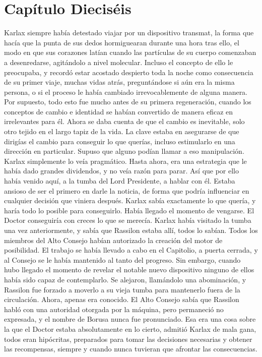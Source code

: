 \chapter*{Capítulo Dieciséis}

Karlax siempre había detestado viajar por un dispositivo transmat, la forma que hacía que la punta de sus dedos hormiguearan durante una hora tras ello, el modo en que sus corazones latían cuando las partículas de su cuerpo comenzaban a desenredarse, agitándolo a nivel molecular. Incluso el concepto de ello le preocupaba, y recordó estar acostado despierto toda la noche como consecuencia de su primer viaje, muchas vidas atrás, preguntándose si aún era la misma persona, o si el proceso le había cambiado irrevocablemente de alguna manera.
Por supuesto, todo esto fue mucho antes de su primera regeneración, cuando los conceptos de cambio e identidad se habían convertido de manera eficaz en irrelevantes para él. Ahora se daba cuenta de que el cambio es inevitable, solo otro tejido en el largo tapiz de la vida. La clave estaba en asegurarse de que dirigías el cambio para conseguir lo que querías, incluso estimularlo en una dirección en particular. Supuso que alguno podían llamar a eso manipulación. Karlax simplemente lo veía pragmático. Hasta ahora, era una estrategia que le había dado grandes dividendos, y no veía razón para parar.
Así que por ello había venido aquí, a la tumba del Lord Presidente, a hablar con él. Estaba ansioso de ser el primero en darle la noticia, de forma que podría influenciar en cualquier decisión que viniera después. Karlax sabía exactamente lo que quería, y haría todo lo posible para conseguirlo. Había llegado el momento de vengarse. El Doctor conseguiría con creces lo que se merecía.
Karlax había visitado la tumba una vez anteriormente, y sabía que Rassilon estaba allí, todos lo sabían. Todos los miembros del Alto Consejo habían autorizado la creación del motor de posibilidad. El trabajo se había llevado a cabo en el Capitolio, a puerta cerrada, y al Consejo se le había mantenido al tanto del progreso. Sin embargo, cuando hubo llegado el momento de revelar el notable nuevo dispositivo ninguno de ellos había sido capaz de contemplarlo. Se alejaron, llamándolo una abominación, y Rassilon fue forzado a moverlo a su vieja tumba para mantenerlo fuera de la circulación.
Ahora, apenas era conocido. El Alto Consejo sabía que Rassilon habló con una autoridad otorgada por la máquina, pero permaneció no expresada, y el nombre de Borusa nunca fue pronunciado.
Esa era una cosa sobre la que el Doctor estaba absolutamente en lo cierto, admitió Karlax de mala gana, todos eran hipócritas, preparados para tomar las decisiones necesarias y obtener las recompensas, siempre y cuando nunca tuvieran que afrontar las consecuencias.
